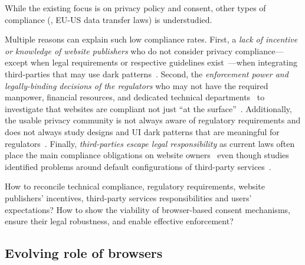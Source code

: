 \begin{opbox}
While the existing focus is on privacy policy and consent, other types of compliance (\eg{}, EU-US data transfer laws) is understudied.
\end{opbox}


Multiple reasons can explain such low compliance rates. First, a \textit{lack of incentive or knowledge of website publishers} who do not consider privacy compliance---except when legal requirements or respective guidelines exist~\cite{utzPrivacyRarelyConsidered2023,Stov-etal-23-PETs}---when integrating third-parties that may use dark patterns~\cite{tothDarkPatternsManipulation2022,grayDarkPatternsLegal2021}. Second, the \textit{enforcement power and legally-binding decisions of the regulators} who may not have the required manpower, financial resources, and dedicated technical departments~\cite{edpbContributionEDPBReport2023} to investigate that websites are compliant not just ``at the surface''~\cite{kyiInvestigatingDeceptiveDesign2023}. Additionally, the usable privacy community is not always aware of regulatory requirements and does not always study designs and UI dark patterns that are meaningful for regulators~\cite{Bielova2024-zr}. 
Finally, \textit{third-parties escape legal responsibility} as current laws often place the main compliance obligations on website owners~\cite{santosConsentManagementPlatforms2021} even though  studies identified problems around default configurations of third-party services~\cite{Koch-etal-25-PETs,Rodr-etal-25-PETs}.

\begin{opbox}
How to reconcile technical compliance, regulatory requirements, 
website publishers' incentives, third-party services responsibilities 
and users’ expectations?
How to show the viability of browser-based consent mechanisms, ensure their legal robustness, and enable effective enforcement?
\end{opbox}
\vspace{-3mm}

\vspace{-1mm}
\subsection{Evolving role of browsers}
\vspace{-4mm}

